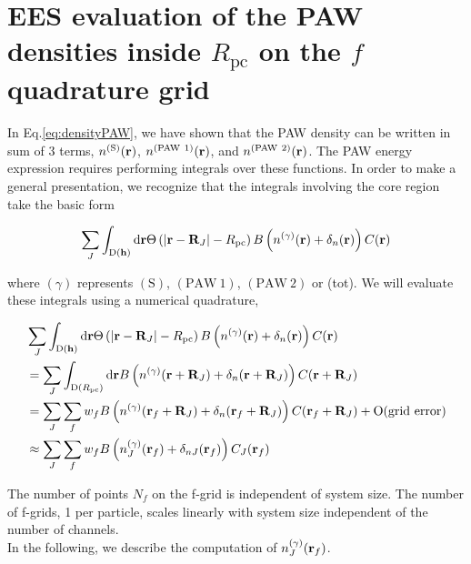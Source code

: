 \documentclass[paper=a4, fontsize=11pt]{article} %
\numberwithin{equation}{section} %
\numberwithin{figure}{section} %
\numberwithin{table}{section} %
\newcommand{\bh}{{\bf{h}}}
\newcommand{\br}{{\bf{r}}}
\newcommand{\bR}{{\bf{R}}}
\newcommand{\rS}{{\mathrm{S}}}
\newcommand{\rP}{{\mathrm{PAW}}}
\newcommand{\rd}{{\mathrm{d}}}
\newcommand{\rD}{{\mathrm{D}}}
\newcommand{\Rpc}{{R_{\mathrm{pc}}}}
\begin{document}

\newpage
\section{EES evaluation of the PAW densities inside $\Rpc$ on the $f$ quadrature grid}
In Eq.\eqref{eq:densityPAW}, we have shown that the PAW density can be written in sum of 3 terms, $n^{(\rS)}(\br)$, $n^{(\rP\ 1)}(\br)$, and $n^{(\rP\ 2)}(\br)$. The PAW energy expression requires performing integrals over these functions. In order to make a general presentation, we recognize that the integrals involving the core region take the basic form

\begin{equation}
\begin{split}
\sum_J\int_{\rD(\bh)} \rd \br \Theta\left(|\br-\bR_J|-\Rpc\right) B\left(n^{(\gamma)}(\br)+\delta_n(\br)\right) C(\br)
\end{split}
\end{equation}

where $(\gamma)$ represents $(\rS)$, $(\rP\ 1)$, $(\rP\ 2)$ or (tot). We will evaluate these integrals using a numerical quadrature,

\begin{equation} \label{eq:nSrftt}
\begin{split}
&\sum_J\int_{\rD(\bh)} \rd \br \Theta\left(|\br-\bR_J|-\Rpc\right)B\left(n^{(\gamma)}(\br)+\delta_n(\br)\right) C(\br)\\
&= \sum_J \int_{\rD(\Rpc)}  \rd \br B\left(n^{(\gamma)}(\br + \bR_J)+\delta_n(\br+\bR_J)\right) C(\br+\bR_J)\\
&= \sum_J \sum_f w_f B\left(n^{(\gamma)}(\br_f + \bR_J)+\delta_n(\br_f+\bR_J)\right)C(\br_f+\bR_J) + \mathrm{O}(\mathrm{grid\ error}) \\
&\approx \sum_J \sum_f w_f B\left(n_J^{(\gamma)}(\br_f) +\delta_{nJ}(\br_f)\right)C_J(\br_f)\\
\end{split}
\end{equation}

The number of points $N_f$ on the f-grid is independent of system size. The number of f-grids, 1 per particle, scales linearly with system size independent of the number of channels. \\

In the following, we describe the computation of $n_J^{(\gamma)}(\br_f)$.
\end{document}
